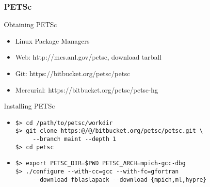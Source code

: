 


\begin{frame}[fragile]
\frametitle{PETSc}
 \begin{block}{Obtaining PETSc}
 \begin{itemize}
  \item Linux Package Managers
  \item Web: http://mcs.anl.gov/petsc, download tarball
  \item Git: https://bitbucket.org/petsc/petsc
  \item Mercurial: https://bitbucket.org/petsc/petsc-hg
 \end{itemize}
 \end{block}

 \begin{block}{Installing PETSc}
 \begin{itemize}
  \item
 \begin{lstlisting}[escapechar={@}]
$> cd /path/to/petsc/workdir
$> git clone https:@/@/bitbucket.org/petsc/petsc.git \
     --branch maint --depth 1
$> cd petsc
 \end{lstlisting}
  \item
 \begin{lstlisting}
$> export PETSC_DIR=$PWD PETSC_ARCH=mpich-gcc-dbg
$> ./configure --with-cc=gcc --with-fc=gfortran 
     --download-fblaslapack --download-{mpich,ml,hypre}
\end{lstlisting}
 \end{itemize}
 \end{block}

\end{frame}

